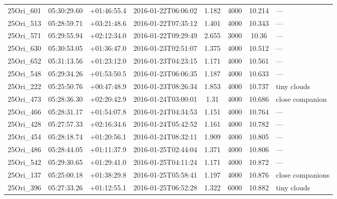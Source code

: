 \documentclass[12pt]{article}
\begin{document}
\begin{table}
\begin{center}
\begin{threeparttable}
\begin{tabular}{lccccccl}
	25Ori\_601    & 05:30:29.60 & +01:46:55.4 & 2016-01-22T06:06:02  & 1.182         & 4000             & 10.214 & ---                      \\
	25Ori\_513    & 05:28:59.71 & +03:21:48.6 & 2016-01-22T07:35:12  & 1.401         & 4000             & 10.343 & ---                      \\
	25Ori\_571    & 05:29:55.94 & +02:12:34.0 & 2016-01-22T09:29:49  & 2.655         & 3000             & 10.36  & ---                      \\
	25Ori\_630    & 05:30:53.05 & +01:36:47.0 & 2016-01-23T02:51:07  & 1.375         & 4000             & 10.512 & ---                      \\
	25Ori\_652    & 05:31:13.56 & +01:23:12.0 & 2016-01-23T04:23:15  & 1.171         & 4000             & 10.561 & ---                      \\
	25Ori\_548    & 05:29:34.26 & +01:53:50.5 & 2016-01-23T06:06:35  & 1.187         & 4000             & 10.633 & ---                      \\
	25Ori\_222    & 05:25:50.76 & +00:47:48.9 & 2016-01-23T08:26:34  & 1.853         & 4000             & 10.737 & tiny clouds              \\
	25Ori\_473    & 05:28:36.30 & +02:20:42.9 & 2016-01-24T03:00:01  & 1.31          & 4000             & 10.686 & close companion         \\
	25Ori\_466    & 05:28:31.17 & +01:54:07.8 & 2016-01-24T04:34:53  & 1.151         & 4000             & 10.764 & ---                      \\
	25Ori\_428    & 05:27:57.33 & +02:16:34.6 & 2016-01-24T05:42:52  & 1.161         & 4000             & 10.782 & ---                      \\
	25Ori\_454    & 05:28:18.74 & +01:20:56.1 & 2016-01-24T08:32:11  & 1.909         & 4000             & 10.805 & ---                      \\
	25Ori\_486    & 05:28:44.05 & +01:11:37.9 & 2016-01-25T02:44:04  & 1.371         & 4000             & 10.806 & ---                      \\
	25Ori\_542    & 05:29:30.65 & +01:29:41.0 & 2016-01-25T04:11:24  & 1.171         & 4000             & 10.872 & ---                      \\
	25Ori\_137    & 05:25:00.18 & +01:38:29.8 & 2016-01-25T05:58:41  & 1.197         & 4000             & 10.876 & close companions         \\
	25Ori\_396    & 05:27:33.26 & +01:12:55.1 & 2016-01-25T06:52:28  & 1.322         & 6000             & 10.882 & tiny clouds              \\

\end{tabular}
\end{threeparttable}
\end{center}
\end{table}
\end{document}
